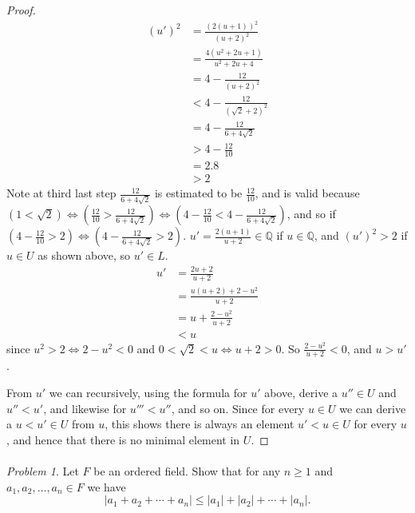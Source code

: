 \documentclass[11pt,twoside, reqno, align]{amsart}
\theoremstyle{remark}
\newtheorem{Prob}{Problem}
\def\Q{\mathbb Q}
\renewcommand{\iff}{\Leftrightarrow}
\begin{document}
\begin{proof}
\begin{align*}
    (u')^2 & = \frac{(2(u+1))^2}{(u+2)^2} \\
    & = \frac{4(u^2 + 2u + 1)}{u^2 + 2u + 4} \\
    & = 4 - \frac{12}{(u+2)^2} \\
    & < 4 - \frac{12}{(\sqrt{2}+2)^2} \\
    & = 4 - \frac{12}{6 + 4\sqrt{2}} \\
    & > 4 - \frac{12}{10} \\
    & = 2.8 \\
    & > 2
\end{align*}
Note at third last step $\frac{12}{6+4\sqrt{2}}$ is estimated to be $\frac{12}{10}$, and is valid because $(1 < \sqrt{2}) \iff (\frac{12}{10} > \frac{12}{6+4\sqrt{2}}) \iff (4-\frac{12}{10} < 4-\frac{12}{6+4\sqrt{2}})$, and so if $(4-\frac{12}{10} > 2) \iff (4-\frac{12}{6+4\sqrt{2}} > 2)$. $u'= \frac{2(u+1)}{u+2} \in \Q$ if $u \in \Q$, and $(u')^2 > 2$ if $u \in U$ as shown above, so $u' \in L$.
\begin{align*}
    u' & = \frac{2u+2}{u+2} \\
    & = \frac{u(u+2)+2-u^2}{u+2} \\
    & = u + \frac{2-u^2}{u+2} \\
    & < u
\end{align*}
since $u^2 > 2 \iff 2 - u^2 < 0$ and $0 < \sqrt{2} < u \iff u+2 > 0$. So $\frac{2-u^2}{u+2} < 0$, and $u > u'$. 

From $u'$ we can recursively, using the formula for $u'$ above, derive a $u'' \in U$ and $u'' < u'$, and likewise for $u''' < u''$, and so on. Since for every $u \in U$ we can derive a $u < u' \in U$ from $u$, this shows there is always an element $u' < u \in U$ for every $u$, and hence that there is no minimal element in $U$.
\end{proof}

\paragraph{}

\begin{Prob}
Let $F$ be an ordered field. Show that for any $n\geq 1$ and $a_1, a_2, \dots, a_n \in F$ we have
$$
|a_1+a_2+\cdots+a_n|\leq |a_1|+|a_2|+\cdots+|a_n|.
$$
\end{Prob}
\end{document}
